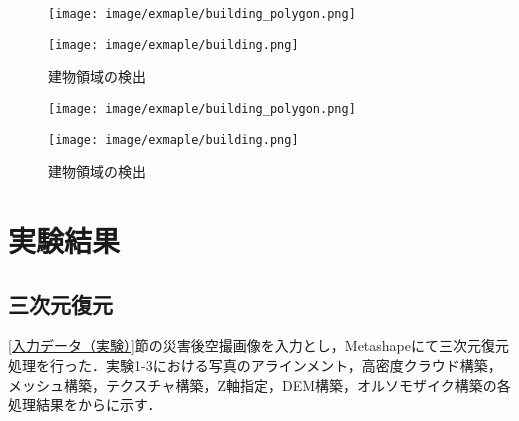     \begin{figure}[t]
      \begin{minipage}[c]{0.45\hsize}
        \centering
        \texttt{[image: image/exmaple/building\_polygon.png]}
      \end{minipage}
      \begin{minipage}[c]{0.45\hsize}
        \centering
        \texttt{[image: image/exmaple/building.png]}
      \end{minipage}
      \caption{建物領域の検出}
      \label{基盤地図情報（実験2）}
    \end{figure}

    \begin{figure}[t]
      \begin{minipage}[c]{0.45\hsize}
        \centering
        \texttt{[image: image/exmaple/building\_polygon.png]}
      \end{minipage}
      \begin{minipage}[c]{0.45\hsize}
        \centering
        \texttt{[image: image/exmaple/building.png]}
      \end{minipage}
      \caption{建物領域の検出}
      \label{基盤地図情報（実験3）}
    \end{figure}



  \section{実験結果}
    \subsection{三次元復元}
      \label{三次元復元}
      \ref{入力データ（実験）}節の災害後空撮画像を入力とし，Metashapeにて三次元復元処理を行った．実験1-3における写真のアラインメント，高密度クラウド構築，メッシュ構築，テクスチャ構築，Z軸指定，DEM構築，オルソモザイク構築の各処理結果をからに示す．
      
